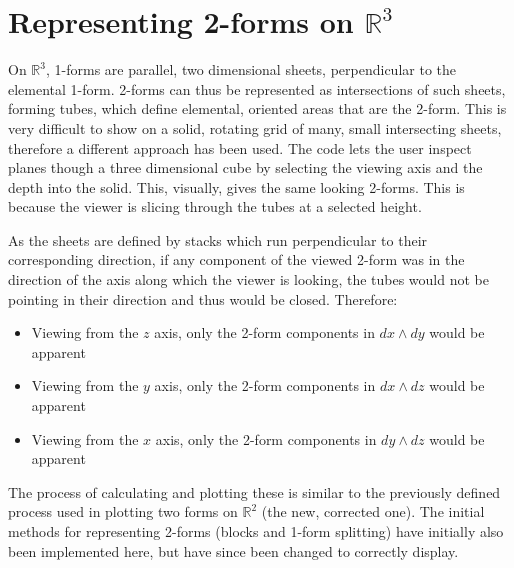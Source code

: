 \documentclass[12pt]{report}
\begin{document}
\section{Representing 2-forms on $\mathbb{R}^{3}$}
On $\mathbb{R}^{3}$, 1-forms are parallel, two dimensional sheets, perpendicular to the elemental 1-form. 2-forms can thus be represented as intersections of such sheets, forming tubes, which define elemental, oriented areas that are the 2-form. This is very difficult to show on a solid, rotating grid of many, small intersecting sheets, therefore a different approach has been used. The code lets the user inspect planes though a three dimensional cube by selecting the viewing axis and the depth into the solid.
This, visually, gives the same looking 2-forms. This is because the viewer is slicing through the tubes at a selected height.

As the sheets are defined by stacks which run perpendicular to their corresponding direction, if any component of the viewed 2-form was in the direction of the axis along which the viewer is looking, the tubes would not be pointing in their direction and thus would be closed. Therefore:
\begin{itemize}
	\item Viewing from the $z$ axis, only the 2-form components in $dx\wedge dy$ would be apparent
	\item Viewing from the $y$ axis, only the 2-form components in $dx\wedge dz$ would be apparent
	\item Viewing from the $x$ axis, only the 2-form components in $dy\wedge dz$ would be apparent
\end{itemize} 

The process of calculating and plotting these is similar to the previously defined process used in plotting two forms on $\mathbb{R}^{2}$ (the new, corrected one). The initial methods for representing 2-forms (blocks and 1-form splitting) have initially also been implemented here, but have since been changed to correctly display.
\end{document}
